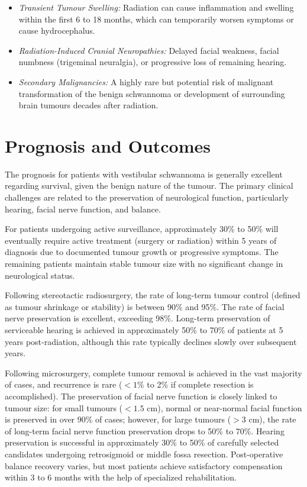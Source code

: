 \begin{itemize}
\begin{itemize}
        \item \textit{Transient Tumour Swelling:} Radiation can cause inflammation and swelling within the first 6 to 18 months, which can temporarily worsen symptoms or cause hydrocephalus.
        \item \textit{Radiation-Induced Cranial Neuropathies:} Delayed facial weakness, facial numbness (trigeminal neuralgia), or progressive loss of remaining hearing.
        \item \textit{Secondary Malignancies:} A highly rare but potential risk of malignant transformation of the benign schwannoma or development of surrounding brain tumours decades after radiation.
    \end{itemize}
\end{itemize}

\section*{Prognosis and Outcomes}
The prognosis for patients with vestibular schwannoma is generally excellent regarding survival, given the benign nature of the tumour. The primary clinical challenges are related to the preservation of neurological function, particularly hearing, facial nerve function, and balance.

For patients undergoing active surveillance, approximately 30\% to 50\% will eventually require active treatment (surgery or radiation) within 5 years of diagnosis due to documented tumour growth or progressive symptoms. The remaining patients maintain stable tumour size with no significant change in neurological status.

Following stereotactic radiosurgery, the rate of long-term tumour control (defined as tumour shrinkage or stability) is between 90\% and 95\%. The rate of facial nerve preservation is excellent, exceeding 98\%. Long-term preservation of serviceable hearing is achieved in approximately 50\% to 70\% of patients at 5 years post-radiation, although this rate typically declines slowly over subsequent years.

Following microsurgery, complete tumour removal is achieved in the vast majority of cases, and recurrence is rare ($< 1\%$ to 2\% if complete resection is accomplished). The preservation of facial nerve function is closely linked to tumour size: for small tumours ($< 1.5$ cm), normal or near-normal facial function is preserved in over 90\% of cases; however, for large tumours ($> 3$ cm), the rate of long-term facial nerve function preservation drops to 50\% to 70\%. Hearing preservation is successful in approximately 30\% to 50\% of carefully selected candidates undergoing retrosigmoid or middle fossa resection. Post-operative balance recovery varies, but most patients achieve satisfactory compensation within 3 to 6 months with the help of specialized rehabilitation.


